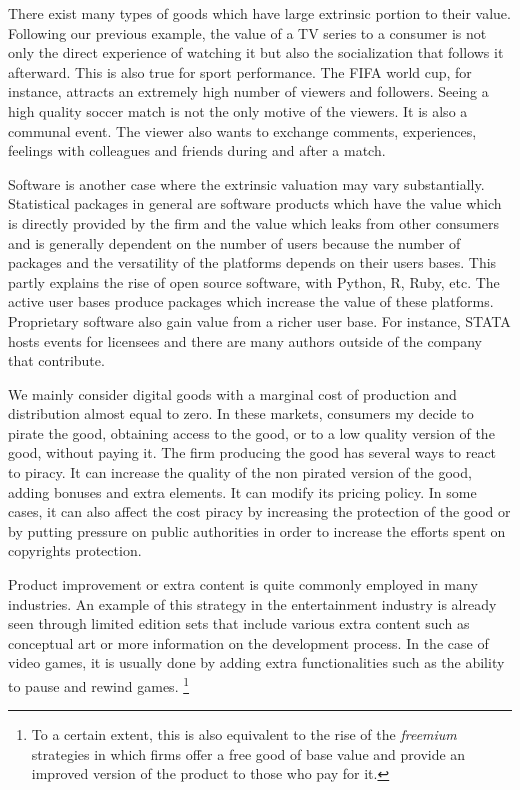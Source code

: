 \documentclass[11pt]{article}
\begin{document}
There exist many types of goods which have large extrinsic portion to their value. Following our previous example, the value of a TV series to a consumer is not only the direct experience of watching it but also the socialization that follows it afterward. This is also true for sport performance. The FIFA world cup, for instance, attracts an extremely high number of viewers and followers. Seeing a high quality soccer match is not the only motive of the viewers. It is also a communal event. The viewer also wants to exchange comments, experiences, feelings with colleagues and friends during and after a match. 

Software is another case where the extrinsic valuation may vary substantially. Statistical packages in general are software products which have the value which is directly provided by the firm and the value which leaks from other consumers and is generally dependent on the number of users because the number of packages and the versatility of the platforms depends on their users bases. This partly explains the rise of open source software, with Python, R, Ruby, etc.  The active user bases produce packages which increase the value of these platforms. Proprietary software also gain value from a richer user base. For instance, STATA hosts events for licensees and there are many authors outside of the company that contribute.

We mainly consider digital goods with a marginal cost of production and distribution almost equal to zero. In these markets, consumers my decide to pirate the good, obtaining access to the good, or to a low quality version of the good, without paying it. The firm producing the good has several ways to react to piracy. It can increase the quality of the non pirated version of the good, adding bonuses and extra elements. It can modify its pricing policy. In some cases, it can also affect the cost piracy by increasing the protection of the good or by putting pressure on public authorities in order to increase the efforts spent on copyrights protection. 

Product improvement or extra content is quite commonly employed in many industries. An example of this strategy in the entertainment industry is already seen through limited edition sets that include various extra content such as conceptual art or more information on the development process. In the case of video games, it is usually done by adding extra functionalities such as the ability to pause and rewind games. \footnote{To a certain extent, this is also equivalent to the rise of the \textit{freemium} strategies in which firms offer a free good of base value and provide an improved version of the product to those who pay for it.}
\end{document}
